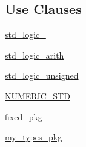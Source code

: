 \subsection*{Use Clauses}
 \begin{DoxyCompactItemize}
\item 
\hyperlink{class_d_e0___n_a_n_o___v_f_acd03516902501cd1c7296a98e22c6fcb}{std\+\_\+logic\+\_}   
\item 
\hyperlink{class_d_e0___n_a_n_o___v_f_a0f5ecc6613f63d07f7963a97b1b26095}{std\+\_\+logic\+\_\+arith}   
\item 
\hyperlink{class_d_e0___n_a_n_o___v_f_a598da929e807d58939b47499e8bc9fa8}{std\+\_\+logic\+\_\+unsigned}   
\item 
\hyperlink{class_d_e0___n_a_n_o___v_f_ae00f3f04545af57582ff10609eee23e2}{N\+U\+M\+E\+R\+I\+C\+\_\+\+S\+T\+D}   
\item 
\hyperlink{class_d_e0___n_a_n_o___v_f_aad86249c80e8c1e7ee1c4748aba748e3}{fixed\+\_\+pkg}   
\item 
\hyperlink{class_d_e0___n_a_n_o___v_f_ac1788a894930eeee5aaed06b4775d746}{my\+\_\+types\+\_\+pkg}   
\end{DoxyCompactItemize}
